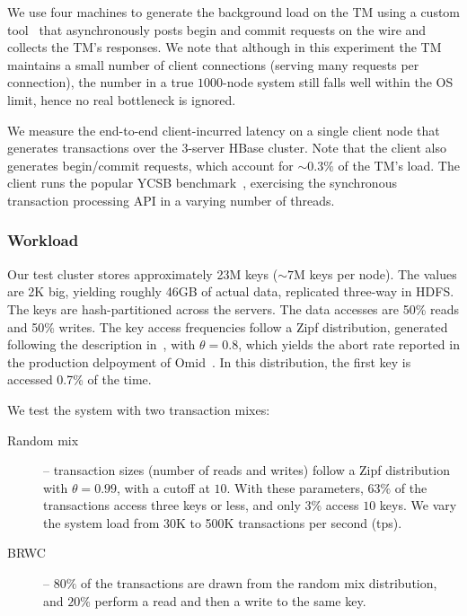 We use four machines to generate the background load on the TM using a custom tool~\cite{Omid2017} 
that asynchronously posts begin and commit requests on the wire and collects the TM's responses. 
We note that although in this experiment the TM maintains a small number of client connections (serving many requests per connection), 
the number in a true $1000$-node system still falls well within the OS limit, hence no real bottleneck is ignored. 

We measure the end-to-end client-incurred latency on a single client node that generates transactions over the $3$-server HBase cluster. 
Note that the client also generates begin/commit requests, which account for \mbox{$\sim0.3\%$} of the TM's load.
The client runs the popular YCSB benchmark~\cite{Cooper:2010:BCS:1807128.1807152}, 
exercising the synchronous transaction processing API in a varying number of threads. 

\subsubsection{Workload}

Our test cluster stores approximately 23M keys ($\sim\!\!7$M keys per node). 
The values are 2K big, yielding roughly 46GB of actual data, replicated three-way in HDFS. The keys are hash-partitioned
across the servers. The data accesses are 50\% reads and 
50\% writes. The key access frequencies follow a Zipf distribution, generated following 
the description in~\cite{Gray:1994:QGB:191839.191886}, with $\theta=0.8$, which yields the abort rate reported
in the production delpoyment of Omid~\cite{Omid2017}. In this distribution, the first key is accessed 0.7\% of the  time.

\noindent
We test the system with two transaction mixes:
\begin{description}
\item[Random mix] -- 
transaction sizes (number of reads and writes) follow a Zipf distribution with $\theta=0.99$, with a cutoff at $10$. 
With these parameters, $63\%$ of the transactions access three keys or less, and only $3\%$ access $10$ keys. 
We vary the system load from 30K to 500K transactions per second (tps). 
\item[BRWC] -- $80\%$ of the transactions are drawn from the random mix distribution, and $20\%$ perform a read
and then a write to the same key. 
\end{description}

